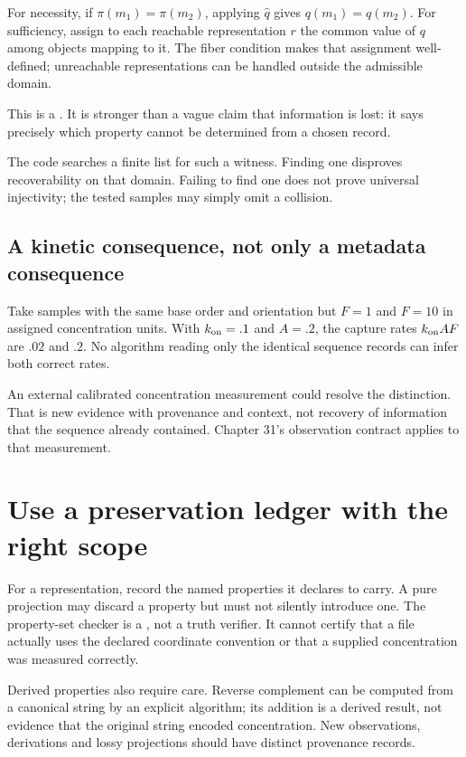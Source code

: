 For necessity, if $\pi(m_1)=\pi(m_2)$, applying $\widehat q$ gives
$q(m_1)=q(m_2)$. For sufficiency, assign to each reachable representation
$r$ the common value of $q$ among objects mapping to it. The fiber condition
makes that assignment well-defined; unreachable representations can be handled
outside the admissible domain.

This is a . It is stronger than a vague
claim that information is lost: it says precisely which property cannot be
determined from a chosen record.

The code searches a finite list for such a witness. Finding one disproves
recoverability on that domain. Failing to find one does not prove universal
injectivity; the tested samples may simply omit a collision.

\subsection{A kinetic consequence, not only a metadata consequence}
Take samples with the same base order and orientation but $F=1$ and $F=10$
in assigned concentration units. With $k_{\rm on}=.1$ and $A=.2$, the capture
rates $k_{\rm on}AF$ are $.02$ and $.2$. No algorithm reading only the identical
sequence records can infer both correct rates.

An external calibrated concentration measurement could resolve the distinction.
That is new evidence with provenance and context, not recovery of information
that the sequence already contained. Chapter 31's observation contract applies
to that measurement.

\section{Use a preservation ledger with the right scope}
For a representation, record the named properties it declares to carry.
A pure projection may discard a property but must not silently introduce one.
The property-set checker is a , not a truth verifier.
It cannot certify that a file actually uses the declared coordinate convention
or that a supplied concentration was measured correctly.

Derived properties also require care. Reverse complement can be computed from
a canonical string by an explicit algorithm; its addition is a derived result,
not evidence that the original string encoded concentration. New observations,
derivations and lossy projections should have distinct provenance records.

